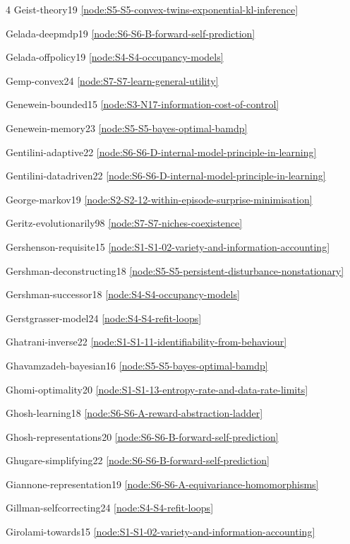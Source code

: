 \documentclass[10pt]{article}
\begin{document}
{\begin{multicols}{4}
Geist-theory19 \hfill \ref{node:S5-S5-convex-twins-exponential-kl-inference}\par
Gelada-deepmdp19 \hfill \ref{node:S6-S6-B-forward-self-prediction}\par
Gelada-offpolicy19 \hfill \ref{node:S4-S4-occupancy-models}\par
Gemp-convex24 \hfill \ref{node:S7-S7-learn-general-utility}\par
Genewein-bounded15 \hfill \ref{node:S3-N17-information-cost-of-control}\par
Genewein-memory23 \hfill \ref{node:S5-S5-bayes-optimal-bamdp}\par
Gentilini-adaptive22 \hfill \ref{node:S6-S6-D-internal-model-principle-in-learning}\par
Gentilini-datadriven22 \hfill \ref{node:S6-S6-D-internal-model-principle-in-learning}\par
George-markov19 \hfill \ref{node:S2-S2-12-within-episode-surprise-minimisation}\par
Geritz-evolutionarily98 \hfill \ref{node:S7-S7-niches-coexistence}\par
Gershenson-requisite15 \hfill \ref{node:S1-S1-02-variety-and-information-accounting}\par
Gershman-deconstructing18 \hfill \ref{node:S5-S5-persistent-disturbance-nonstationary}\par
Gershman-successor18 \hfill \ref{node:S4-S4-occupancy-models}\par
Gerstgrasser-model24 \hfill \ref{node:S4-S4-refit-loops}\par
Ghatrani-inverse22 \hfill \ref{node:S1-S1-11-identifiability-from-behaviour}\par
Ghavamzadeh-bayesian16 \hfill \ref{node:S5-S5-bayes-optimal-bamdp}\par
Ghomi-optimality20 \hfill \ref{node:S1-S1-13-entropy-rate-and-data-rate-limits}\par
Ghosh-learning18 \hfill \ref{node:S6-S6-A-reward-abstraction-ladder}\par
Ghosh-representations20 \hfill \ref{node:S6-S6-B-forward-self-prediction}\par
Ghugare-simplifying22 \hfill \ref{node:S6-S6-B-forward-self-prediction}\par
Giannone-representation19 \hfill \ref{node:S6-S6-A-equivariance-homomorphisms}\par
Gillman-selfcorrecting24 \hfill \ref{node:S4-S4-refit-loops}\par
Girolami-towards15 \hfill \ref{node:S1-S1-02-variety-and-information-accounting}\par

\end{multicols}}
\end{document}
